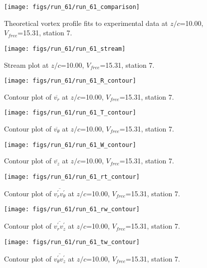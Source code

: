 \begin{figure}[H]
\centering
\texttt{[image: figs/run\_61/run\_61\_comparison]}
\caption{Theoretical vortex profile fits to experimental data at $z/c$=10.00, $V_{free}$=15.31, station 7.}
\end{figure}


\begin{figure}[H]
\centering
\texttt{[image: figs/run\_61/run\_61\_stream]}
\caption{Stream plot at $z/c$=10.00, $V_{free}$=15.31, station 7.}
\end{figure}


\begin{figure}[H]
\centering
\texttt{[image: figs/run\_61/run\_61\_R\_contour]}
\caption{Contour plot of $\overline{v_{r}}$ at $z/c$=10.00, $V_{free}$=15.31, station 7.}
\end{figure}


\begin{figure}[H]
\centering
\texttt{[image: figs/run\_61/run\_61\_T\_contour]}
\caption{Contour plot of $\overline{v_{\theta}}$ at $z/c$=10.00, $V_{free}$=15.31, station 7.}
\end{figure}


\begin{figure}[H]
\centering
\texttt{[image: figs/run\_61/run\_61\_W\_contour]}
\caption{Contour plot of $\overline{v_{z}}$ at $z/c$=10.00, $V_{free}$=15.31, station 7.}
\end{figure}


\begin{figure}[H]
\centering
\texttt{[image: figs/run\_61/run\_61\_rt\_contour]}
\caption{Contour plot of $\overline{v_{r}^{\prime} v_{\theta}^{\prime}}$ at $z/c$=10.00, $V_{free}$=15.31, station 7.}
\end{figure}


\begin{figure}[H]
\centering
\texttt{[image: figs/run\_61/run\_61\_rw\_contour]}
\caption{Contour plot of $\overline{v_{r}^{\prime} v_{z}^{\prime}}$ at $z/c$=10.00, $V_{free}$=15.31, station 7.}
\end{figure}


\begin{figure}[H]
\centering
\texttt{[image: figs/run\_61/run\_61\_tw\_contour]}
\caption{Contour plot of $\overline{v_{\theta}^{\prime} v_{z}^{\prime}}$ at $z/c$=10.00, $V_{free}$=15.31, station 7.}
\end{figure}


